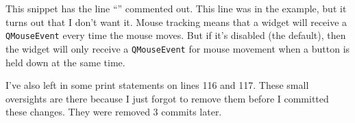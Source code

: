 \documentclass[../development.tex]{subfiles}
\begin{document}

This snippet has the line \enquote{} commented out. This line was in the example, but it turns out that I don't want it. Mouse tracking means that a widget will receive a \texttt{QMouseEvent} every time the mouse moves. But if it's disabled (the default), then the widget will only receive a \texttt{QMouseEvent} for mouse movement when a button is held down at the same time.

I've also left in some print statements on lines 116 and 117. These small oversights are there because I just forgot to remove them before I committed these changes. They were removed 3 commits later.
\end{document}
